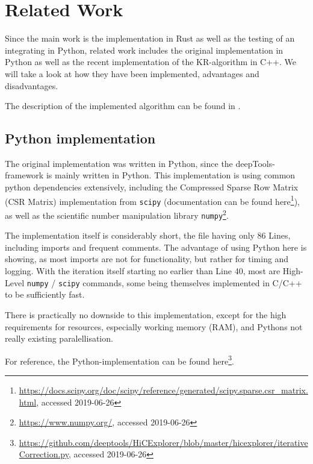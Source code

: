 \chapter{Related Work}\label{chap:relatedwork}

Since the main work is the implementation in Rust as well as the testing of an
integrating in Python, related work includes the original implementation in
Python as well as the recent implementation of the KR-algorithm in C++.
We will take a look at how they have been implemented, advantages and
disadvantages.

 The description of the implemented algorithm can be found in .


\section{Python implementation}\label{sec:python}


The original implementation was written in Python, since the
deepTools-framework is mainly written in Python. This implementation is using
common python dependencies extensively, including the Compressed Sparse Row
Matrix (CSR Matrix) implementation from \verb|scipy| (documentation can be
found
here\footnote{\url{https://docs.scipy.org/doc/scipy/reference/generated/scipy.sparse.csr_matrix.html},
accessed 2019-06-26}), as well as the scientific number manipulation library
\verb|numpy|\footnote{\url{https://www.numpy.org/}, accessed 2019-06-26}.

The implementation itself is considerably short, the file having only 86 Lines,
including imports and frequent comments. The advantage of using Python here is
showing, as most imports are not for functionality, but rather for timing and
logging. With the iteration itself starting no earlier than Line 40, most
are High-Level \verb|numpy| / \verb|scipy| commands, some being themselves
implemented in C/C++ to be sufficiently fast.

There is practically no downside to this implementation, except for the high
requirements for resources, especially working memory (RAM), and Pythons not really existing paralellisation.

For reference, the Python-implementation can be found
here\footnote{\url{https://github.com/deeptools/HiCExplorer/blob/master/hicexplorer/iterativeCorrection.py},
accessed 2019-06-26}.





